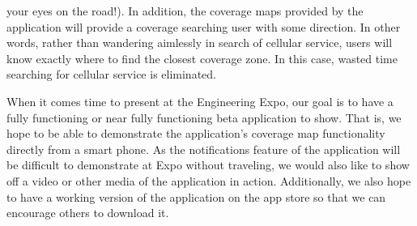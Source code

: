 \documentclass[letterpaper,10pt,draftclsnofoot,onecolumn]{IEEEtran}
\begin{document}
your eyes on the road!). In addition, the coverage maps provided by the
application will provide a coverage searching user with some direction. In other
words, rather than wandering aimlessly in search of cellular service, users will
know exactly where to find the closest coverage zone. In this case, wasted time
searching for cellular service is eliminated.\par
When it comes time to present at the Engineering Expo, our goal is to have a
fully functioning or near fully functioning beta application to show. That is,
we hope to be able to demonstrate the application's coverage map functionality
directly from a smart phone. As the notifications feature of the application will be difficult to demonstrate at Expo without traveling, we would also like
to show off a video or other media of the application in action. Additionally,
we also hope to have a working version of the application on the app store so
that we can encourage others to download it.\par

\end{document}

